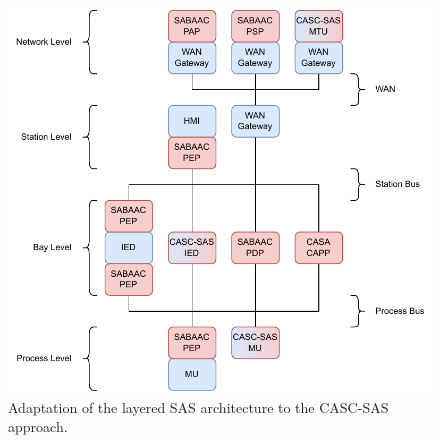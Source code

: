\begin{figure}
    \centering
    \includegraphics[width=1.0\linewidth]{figures/casc_architecture_color.drawio.pdf}
    \caption{Adaptation of the layered SAS architecture to the CASC-SAS approach.
    }
    \label{fig:casc_architecture}
\end{figure}
%
